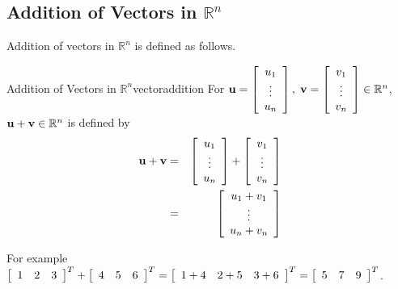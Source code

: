 \subsection{Addition of Vectors in \texorpdfstring{$\mathbb{R}^n$}{Rn}}

Addition of vectors in $\mathbb{R}^n$ is defined as follows.

\begin{definition}{Addition of Vectors in $\mathbb{R}^n$}{vectoraddition}
For ${\bf u}=\left[ \begin{array}{c}
u_{1} \\
\vdots \\
u_{n}
\end{array}
\right],\; {\bf v}= \left[ \begin{array}{c}
v_{1} \\
\vdots \\
v_{n}
\end{array}
\right] \in \mathbb{R}^{n}$,
 ${\bf u}+{\bf v}\in \mathbb{R}^{n}$ is defined by
\begin{eqnarray*}
{\bf u}+{\bf v} &=& \left[ \begin{array}{c}
u_{1} \\
\vdots \\
u_{n}
\end{array}
\right] +  \left[ \begin{array}{c}
v_{1} \\
\vdots \\
v_{n}
\end{array} \right]\\
& =& \left[ \begin{array}{c}
u_{1}+v_{1} \\
\vdots \\
u_{n}+v_{n}
\end{array}
\right]
\end{eqnarray*}
\end{definition}

For example 
$\left[
\begin{array}{rrr}
1 & 2 & 3
\end{array}
\right]^T +
\left[
\begin{array}{rrr}
4 & 5 & 6
\end{array}
\right]^T
=
\left[
\begin{array}{rrr}
1+4 & 2+5 & 3+6
\end{array}
\right]^T
=
\left[
\begin{array}{rrr}
5 & 7 & 9
\end{array}
\right]^T$.

